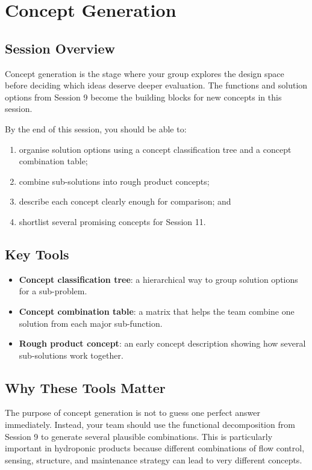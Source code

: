 \chapter{Concept Generation}

\section{Session Overview}

Concept generation is the stage where your group explores the design space before deciding which ideas deserve deeper evaluation. The functions and solution options from Session 9 become the building blocks for new concepts in this session.

By the end of this session, you should be able to:
\begin{enumerate}
    \item organise solution options using a concept classification tree and a concept combination table;
    \item combine sub-solutions into rough product concepts;
    \item describe each concept clearly enough for comparison; and
    \item shortlist several promising concepts for Session 11.
\end{enumerate}

\section{Key Tools}

\begin{itemize}
    \item \textbf{Concept classification tree}: a hierarchical way to group solution options for a sub-problem.
    \item \textbf{Concept combination table}: a matrix that helps the team combine one solution from each major sub-function.
    \item \textbf{Rough product concept}: an early concept description showing how several sub-solutions work together.
\end{itemize}

\section{Why These Tools Matter}

The purpose of concept generation is not to guess one perfect answer immediately. Instead, your team should use the functional decomposition from Session 9 to generate several plausible combinations. This is particularly important in hydroponic products because different combinations of flow control, sensing, structure, and maintenance strategy can lead to very different concepts.

